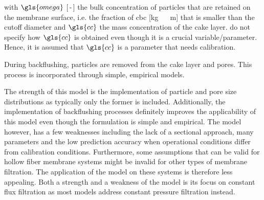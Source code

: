 with $\gls{omega}$ [\,-\,] the bulk concentration of particles that are retained on the membrane surface, i.e. the fraction of \gls{cbc} [\unit{\kilogram\, \rpcubic\metre}] that is smaller than the cutoff diameter and $\gls{cc}$ the mass concentration of the cake layer. \cite{Broeckmann2006} do not specify how $\gls{cc}$ is obtained even though it is a crucial variable/parameter. Hence, it is assumed that $\gls{cc}$ is a parameter that needs calibration. \par
During backflushing, particles are removed from the cake layer and pores. This process is incorporated through simple, empirical models. \par
The strength of this model is the implementation of particle and pore size distributions as typically only the former is included. Additionally, the implementation of backflushing processes definitely improves the applicability of this model even though the formulation is simple and empirical. The model however, has a few weaknesses including the lack of a sectional approach, many parameters and the low prediction accuracy when operational conditions differ from calibration conditions. Furthermore, some assumptions that can be valid for hollow fiber membrane systems might be invalid for other types of membrane filtration. The application of the model on these systems is therefore less appealing. Both a strength and a weakness of the model is its focus on constant flux filtration as most models address constant pressure filtration instead.
